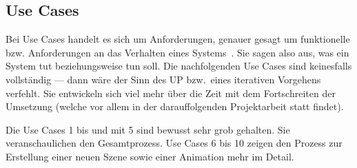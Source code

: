 
\subsection{Use Cases}
\label{subsec:requirements:use-cases}

Bei Use Cases handelt es sich um Anforderungen, genauer gesagt um funktionelle
bzw. Anforderungen an das Verhalten eines Systems~\cite[S. 61 bis 63]{larman_applying_2004}.
Sie sagen also aus, was ein System tut beziehungsweise tun soll. Die nachfolgenden Use
Cases sind keinesfalls vollständig --- dann wäre der Sinn des UP bzw.\ eines
iterativen Vorgehens verfehlt. Sie entwickeln sich viel mehr über die Zeit mit
dem Fortschreiten der Umsetzung (welche vor allem in der darauffolgenden
Projektarbeit statt findet).

Die Use Cases 1 bis und mit 5 sind bewusst sehr grob gehalten. Sie
veranschaulichen den Gesamtprozess. Use Cases 6 bis 10 zeigen den Prozess zur
Erstellung einer neuen Szene sowie einer Animation mehr im Detail.

